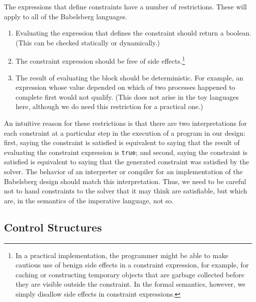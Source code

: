 The expressions that define constraints have a number of restrictions.
These will apply to all of the Babelsberg languages.

\begin{enumerate}

\item \label{item:constraint-type} Evaluating the expression that defines the
  constraint should return a boolean.  (This can be checked statically or
  dynamically.)

\item \label{item:side-effects} The constraint expression should be
  free of side
  effects.\footnote{\label{footnote:benign-side-effects}In a practical
    implementation, the programmer might be able to make cautious use of
    benign side effects in a constraint expression, for example, for
    caching or constructing temporary objects that are garbage
    collected before they are visible outside the constraint.  In the
    formal semantics, however, we simply disallow side effects in
    constraint expressions.}

\item The result of evaluating the block
  should be deterministic.  For example, an expression whose value
  depended on which of two processes happened to complete first
  would not qualify.  (This does not arise in the toy languages here,
  although we do need this restriction for a practical one.)

\end{enumerate}

An intuitive reason for these restrictions is that there are two
interpretations for each constraint at a particular step in the
execution of a program in our design: first, saying the constraint is
satisfied is equivalent to saying that the result of evaluating the
constraint expression is \verb|true|; and second, saying the
constraint is satisfied is equivalent to saying that the generated
constraint was satisfied by the solver. The behavior of an interpreter
or compiler for an implementation of the Babelsberg design should
match this interpretation. Thus, we need to be careful not to hand
constraints to the solver that it may think are satisfiable, but which
are, in the semantics of the imperative language, not so.

\subsection{Control Structures}

